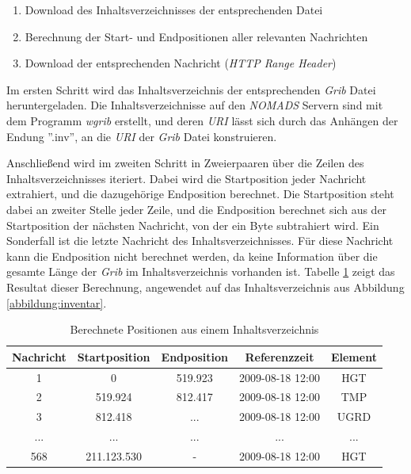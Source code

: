 \begin{enumerate}
\item Download des Inhaltsverzeichnisses der entsprechenden Datei
\item Berechnung der Start- und Endpositionen aller relevanten Nachrichten
\item Download der entsprechenden Nachricht (\textit{HTTP Range Header})
\end{enumerate}

Im ersten Schritt wird das Inhaltsverzeichnis der entsprechenden
\textit{Grib} Datei heruntergeladen. Die Inhaltsverzeichnisse auf den
\textit{NOMADS} Servern sind mit dem Programm \textit{wgrib} erstellt,
und deren \textit{URI} lässt sich durch das Anhängen der Endung
''.inv'', an die \textit{URI} der \textit{Grib} Datei konstruieren.

Anschließend wird im zweiten Schritt in Zweierpaaren über die Zeilen
des Inhaltsverzeichnisses iteriert. Dabei wird die Startposition jeder
Nachricht extrahiert, und die dazugehörige Endposition berechnet. Die
Startposition steht dabei an zweiter Stelle jeder Zeile, und die
Endposition berechnet sich aus der Startposition der nächsten
Nachricht, von der ein Byte subtrahiert wird. Ein Sonderfall ist die
letzte Nachricht des Inhaltsverzeichnisses. Für diese Nachricht kann
die Endposition nicht berechnet werden, da keine Information über die
gesamte Länge der \textit{Grib} im Inhaltsverzeichnis vorhanden
ist. Tabelle \ref{tab:inhaltsverzeichnis_mit_positionen} zeigt das
Resultat dieser Berechnung, angewendet auf das Inhaltsverzeichnis aus
Abbildung \ref{abbildung:inventar}.

\begin{table}[h]
  \centering
  {\sf
    \footnotesize
    \begin{longtable}{@{}ccccc}
      \toprule
      \textbf{Nachricht} & \textbf{Startposition} & \textbf{Endposition} & \textbf{Referenzzeit} & \textbf{Element} \\
      \midrule
      1 & 0 & 519.923 & 2009-08-18 12:00 & HGT \\
      2 & 519.924 & 812.417 & 2009-08-18 12:00 & TMP \\
      3 & 812.418 & ... & 2009-08-18 12:00 & UGRD \\
      ... & ... & ... & ... & ... \\
      568 & 211.123.530 & - & 2009-08-18 12:00 & HGT \\
      \bottomrule
    \end{longtable}
  }

  \caption{Berechnete Positionen aus einem Inhaltsverzeichnis}
  \label{tab:inhaltsverzeichnis_mit_positionen}

\end{table}

